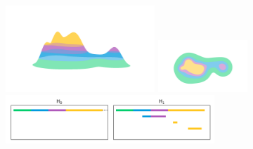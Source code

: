 \begin{figure}[htbp]
  \centering
  \includegraphics[trim=200 200 200 200, clip, width=0.5\textwidth]{scripts/figures/surf/side.png}
  \includegraphics[trim=200 0 200 200, clip, width=0.3\textwidth]{scripts/figures/surf/top.png}
  \includegraphics[width=0.7\textwidth]{scripts/figures/scalar_barcode_true.png}
\end{figure}
